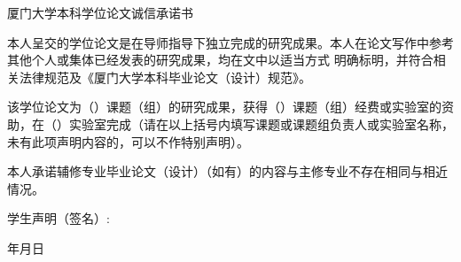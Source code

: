 {    %
    \pagestyle{empty}
    \vspace*{1em}
    \begin{center}
        \sf{}厦门大学本科学位论文诚信承诺书
    \end{center}
    \vspace{3em}
    {
        \renewcommand{\baselinestretch}{2}
        \par
        本人呈交的学位论文是在导师指导下独立完成的研究成果。本人在论文写作中参考其他个人或集体已经发表的研究成果，均在文中以适当方式 明确标明，并符合相关法律规范及《厦门大学本科毕业论文（设计）规范》。
        \par
        该学位论文为（\qquad \qquad \qquad \qquad \qquad \qquad）课题（组）的研究成果，获得（\qquad \qquad \qquad \qquad）课题（组）经费或实验室的资助，在（\qquad \qquad \qquad \qquad）实验室完成（请在以上括号内填写课题或课题组负责人或实验室名称，未有此项声明内容的，可以不作特别声明）。
        \par
        本人承诺辅修专业毕业论文（设计）（如有）的内容与主修专业不存在相同与相近情况。
        \vspace{4em}
        \par
        \hfill 学生声明（签名）:\qquad \qquad \qquad \quad~
        \par
        \hfill 年\qquad 月\qquad 日
        \par
    }
    \clearpage
    \ifthenelse{\isundefined{\xmu@print}}{}{\cleardoublepage}

}


\newenvironment{abstract}{
    \chapter*{摘\quad\; 要}
    \pagestyle{fancy}
    \fancyhf{}
    \renewcommand{\headrulewidth}{0pt}
    \fancyfoot[C]{\rm\zihao{-5}\thepage}
    \vspace{1em}
    \par
}{
    \par
    \vspace{1em}
    \noindent
    {\sf\zihao{-4}关键词：}\xmu@keywords
    \def\xmu@inabstract{true}
    \clearpage
}

\newenvironment{enabstract}{
    \let\xmu@inabstract\relax
    \chapter*{\bf Abstract}
    \pagestyle{fancy}
    \fancyhf{}
    \renewcommand{\headrulewidth}{0pt}
    \fancyfoot[C]{\rm\zihao{-5}\thepage}
    \vspace{1em}
    \par
}{
    \par
    \vspace{1em}
    \noindent
    {\bf\zihao{-4}Key Words: }\xmu@enkeywords
    \clearpage
    \ifthenelse{\isundefined{\xmu@print}}{}{\cleardoublepage}
}

